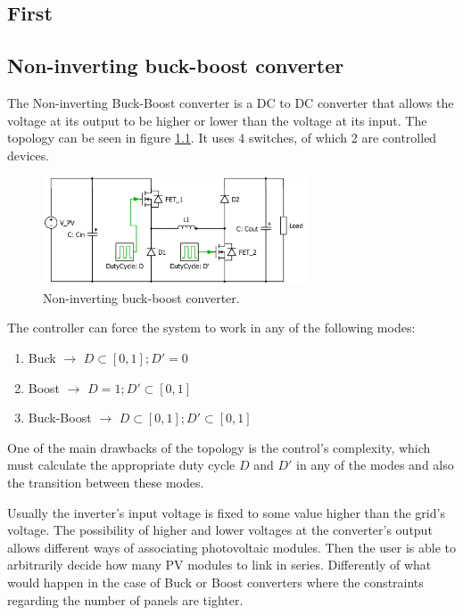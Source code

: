 \documentclass[11pt,a4paper]{report}
\begin{document}
	\begin{center}
		
	\chapter{First}
		\section{Non-inverting buck-boost converter\label{N_INV_BB}}
		
		The Non-inverting Buck-Boost converter is a DC to DC converter that allows the voltage at its output to be higher or lower than the voltage at its input. The topology can be seen in figure \ref{N_INV_BB_SCHEMATIC}. It uses 4 switches, of which 2 are controlled devices. 
		
		\begin{figure}
			\includegraphics[width=0.7\textwidth]{2_d_H_B_BB}
			\caption{Non-inverting buck-boost converter.}
			\label{N_INV_BB_SCHEMATIC}
		\end{figure}
		
		The controller can force the system to work in any of the following modes:
		\begin{enumerate}
			\item Buck $\rightarrow$ $ D \subset [0,1];	 D' = 0 $
			\item Boost $\rightarrow$ $ D = 1;	 D' \subset [0,1] $
			\item Buck-Boost $\rightarrow$ $ D \subset [0,1]; D' \subset [0,1] $
		\end{enumerate}
		One of the main drawbacks of the topology is the control's complexity, which must calculate the appropriate duty cycle $D$ and $D'$ in any of the modes and also the transition between these modes. 
		
		Usually the inverter's input voltage is fixed to some value higher than the grid's voltage. The possibility of higher and lower voltages at the converter's output allows different ways of associating photovoltaic modules. Then the user is able to arbitrarily decide how many PV modules to link in series. Differently of what would happen in the case of Buck or Boost converters where the constraints regarding the number of panels are tighter.
		

\end{center}
\end{document}
